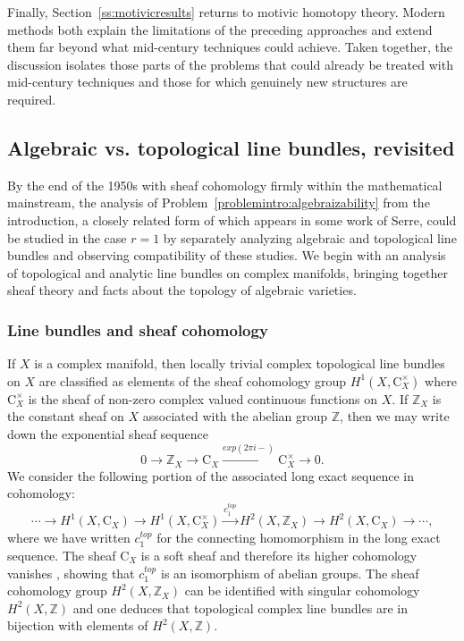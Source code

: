 \documentclass[11pt,leqno]{article}
\newcommand{\C}{{\mathrm C}}
\newcommand{\Z}{{\mathbb Z}}
\renewcommand{\1}{{\rm 1\hspace*{-0.4ex}%
\rule{0.1ex}{1.52ex}\hspace*{0.2ex}}}
\newcommand{\<}[1]{{\langle}#1 {\rangle}}
\newcounter{intro}
\theoremstyle{plain}
\theoremstyle{definition}
\theoremstyle{remark}
\numberwithin{equation}{subsection}
\begin{document}
Finally, Section~\ref{ss:motivicresults} returns to motivic homotopy theory. Modern methods both explain the limitations of the preceding approaches and extend them far beyond what mid-century techniques could achieve. Taken together, the discussion isolates those parts of the problems that could already be treated with mid-century techniques and those for which genuinely new structures are required.

\subsection{Algebraic vs. topological line bundles, revisited}
\label{ss:linebundlecomparison}
By the end of the 1950s with sheaf cohomology firmly within the mathematical mainstream, the analysis of Problem~\ref{problemintro:algebraizability} from the introduction, a closely related form of which appears in some work of Serre, could be studied in the case $r = 1$ by separately analyzing algebraic and topological line bundles and observing compatibility of these studies.  We begin with an analysis of topological and analytic line bundles on complex manifolds, bringing together sheaf theory and facts about the topology of algebraic varieties. 

\subsubsection*{Line bundles and sheaf cohomology}
If $X$ is a complex manifold, then locally trivial complex topological line bundles on $X$ are classified as elements of the sheaf cohomology group $H^1(X,\C^{\times}_X)$ where $\C^{\times}_X$ is the sheaf of non-zero complex valued continuous functions on $X$.  If $\Z_X$ is the constant sheaf on $X$ associated with the abelian group $\Z$, then we may write down the exponential sheaf sequence
\[
0 \longrightarrow \Z_X \longrightarrow \C_X \stackrel{exp(2\pi i -)}{\longrightarrow} \C^{\times}_X \longrightarrow 0.
\]   
We consider the following portion of the associated long exact sequence in cohomology:
\[
\cdots \longrightarrow H^1(X,\C_X) \longrightarrow H^1(X,\C^{\times}_X) \stackrel{c_1^{top}}{\longrightarrow} H^2(X,\Z_X) \longrightarrow H^2(X,\C_X) \longrightarrow \cdots,
\]
where we have written $c_1^{top}$ for the connecting homomorphism in the long exact sequence.  The sheaf $\C_X$ is a soft sheaf and therefore its higher cohomology vanishes \cite{Godement1958Topologie}, showing that $c_1^{top}$ is an isomorphism of abelian groups.  The sheaf cohomology group $H^2(X,\Z_X)$ can be identified with singular cohomology $H^2(X,\Z)$ and one deduces that topological complex line bundles are in bijection with elements of $H^2(X,\Z)$.
\end{document}
